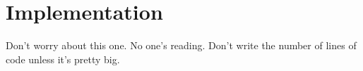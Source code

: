 \section{Implementation}\label{sec:implementation}

Don't worry about this one.
No one's reading.
Don't write the number of lines of code unless it's pretty big.
